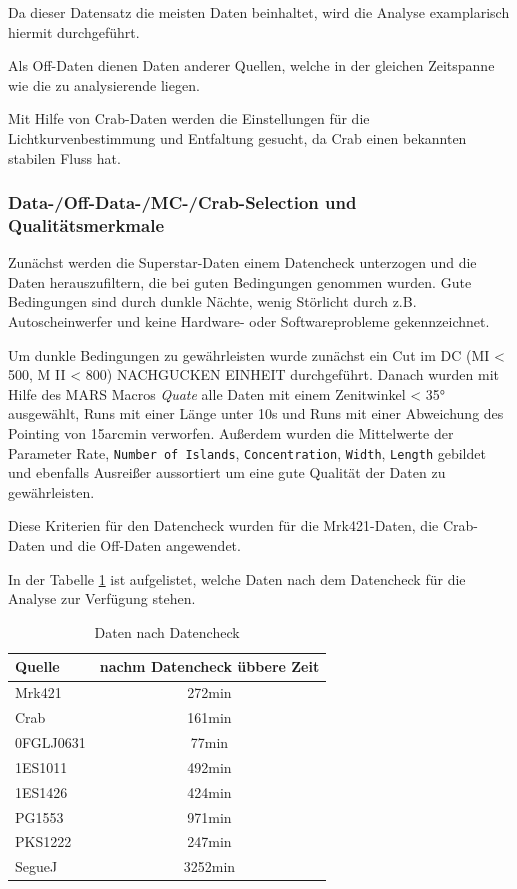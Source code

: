 Da dieser Datensatz die meisten Daten beinhaltet, wird die Analyse examplarisch hiermit durchgeführt.

Als Off-Daten dienen Daten anderer Quellen, welche in der gleichen Zeitspanne wie die zu analysierende liegen.

Mit Hilfe von Crab-Daten werden die Einstellungen für die Lichtkurvenbestimmung und Entfaltung gesucht, da Crab einen bekannten stabilen Fluss hat. 


\subsubsection{Data-/Off-Data-/MC-/Crab-Selection und Qualitätsmerkmale}
Zunächst werden die Superstar-Daten einem Datencheck unterzogen und die Daten herauszufiltern, die bei guten Bedingungen genommen wurden.
Gute Bedingungen sind durch dunkle Nächte, wenig Störlicht durch z.B. Autoscheinwerfer und keine Hardware- oder Softwareprobleme gekennzeichnet.

Um dunkle Bedingungen zu gewährleisten wurde zunächst ein Cut im DC (MI < 500, M II < 800) NACHGUCKEN EINHEIT durchgeführt.
Danach wurden mit Hilfe des MARS Macros \textit{Quate} alle Daten mit einem Zenitwinkel < 35° ausgewählt, Runs mit einer Länge unter 10s und Runs mit einer Abweichung des Pointing von 15arcmin verworfen.
Außerdem wurden die Mittelwerte der Parameter Rate, \texttt{Number of Islands}, \texttt{Concentration}, \texttt{Width}, \texttt{Length} gebildet und ebenfalls Ausreißer aussortiert um eine gute Qualität der Daten zu gewährleisten.

Diese Kriterien für den Datencheck wurden für die Mrk421-Daten, die Crab-Daten und die Off-Daten angewendet.

In der Tabelle \ref{tab:Datenset2} ist aufgelistet, welche Daten nach dem Datencheck für die Analyse zur Verfügung stehen.


\begin{table}[!h]
\centering
\caption{Daten nach Datencheck}
\label{tab:Datenset2}
\begin{tabular}{lc}
  \toprule
  Quelle & nachm Datencheck übbere Zeit\\
  \midrule
  \midrule
  Mrk421 & 272min\\
  \midrule
  Crab & 161min\\
  \midrule
  0FGLJ0631 & 77min \\
  1ES1011 & 492min \\
  1ES1426 & 424min \\
  PG1553 & 971min \\
  PKS1222 & 247min \\
  SegueJ & 3252min \\
  \bottomrule
  \bottomrule
\end{tabular}
\end{table}

